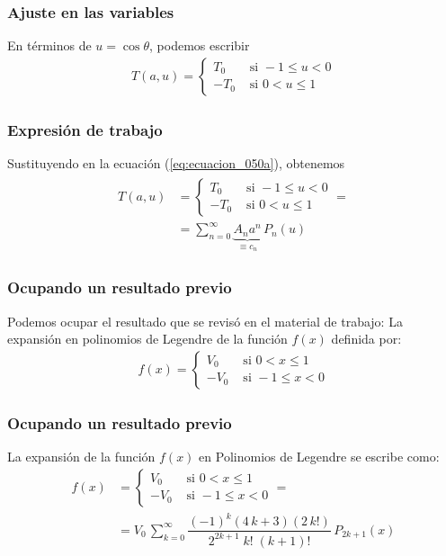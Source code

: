\begin{frame}
\frametitle{Ajuste en las variables}
En términos de $u = \cos \theta$, podemos escribir
\begin{align*}
T(a, u) = 
\begin{cases}
T_{0} & \mbox{ si } -1 \leq u < 0 \\[0.5em]
-T_{0} & \mbox{ si } 0 < u \leq 1 
\end{cases}
\end{align*}
\end{frame}
\begin{frame}
\frametitle{Expresión de trabajo}
Sustituyendo en la ecuación (\ref{eq:ecuacion_050a}), obtenemos
\begin{align} 
\begin{aligned}
T(a, u) &= 
\begin{cases}
T_{0} & \mbox{ si } -1 \leq u < 0 \\[0.5em]
-T_{0} & \mbox{ si } 0 < u \leq 1 
\end{cases} = \\[0.5em]
&= \sum_{n=0}^{\infty} \underbrace{A_{n} a^{n}}_{\equiv c_{n}} \, P_{n}(u)
\end{aligned}
\label{eq:ecuacion_051a}
\end{align}
\end{frame}
\begin{frame}
\frametitle{Ocupando un resultado previo}
Podemos ocupar el resultado que se revisó en el material de trabajo: \pause La expansión en polinomios de Legendre de la función $f(x)$ definida por:
\begin{align*}
f(x) = \begin{cases}
V_{0} & \mbox{ si } 0 < x \leq 1 \\[0.5em]
- V_{0} & \mbox{ si } -1 \leq x < 0
\end{cases}
\end{align*}
\end{frame}
\begin{frame}
\frametitle{Ocupando un resultado previo}
La expansión de la función $f(x)$ en Polinomios de Legendre se escribe como:
\begin{align*}
f(x) &= \begin{cases}
V_{0} & \mbox{ si } 0 < x \leq 1 \\[0.5em]
-V_{0} & \mbox{ si } -1 \leq x < 0
\end{cases}
= \\[0.5em]
&= V_{0} \, \sum_{k=0}^{\infty} \dfrac{(-1)^{k}(4 \, k + 3)(2 \, k!)}{2^{2k+1} \; k! \; (k+1)!} \, P_{2k+1} (x)
\end{align*}
\end{frame}
